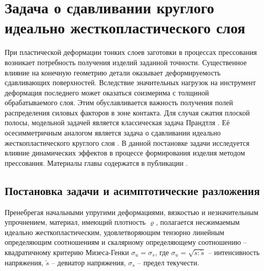 \chapter{Задача о сдавливании круглого идеально жесткопластического слоя}\label{ch:ch1}
При пластической деформации тонких слоев заготовки в процессах прессования возникает потребность получения изделий заданной точности. Существенное влияние на конечную геометрию детали оказывает деформируемость сдавливающих поверхностей. Вследствие значительных нагрузок на инструмент деформация последнего может оказаться соизмерима с толщиной обрабатываемого слоя. Этим обуславливается важность получения полей распределения силовых факторов в зоне контакта. Для случая сжатия плоской полосы, модельной задачей является классическая задача Прандтля \autocite{Prandtl:1948}. Её осесимметричным аналогом является задача о сдавливании идеально жесткопластического круглого слоя \autocite{Georgievsky:2008}. В данной постановке задачи исследуется влияние динамических эффектов в процессе формирования изделия методом прессования. Материалы главы содержатся в публикации \autocite{Shabaykin:2017}.

\section{Постановка задачи и асимптотические разложения}\label{sec:ch1/sec1}

Пренебрегая начальными упругими деформациями, вязкостью и незначительным упрочнением, материал, имеющий плотность $\varrho$, полагается несжимаемым идеально жесткопластическим, удовлетворяющим тензорно линейным определяющим соотношениям и скалярному определяющему соотношению -- квадратичному критерию Мизеса-Генки $\sigma_{u} = \sigma_{s}$, где $\sigma_{u} = \sqrt{\utilde{s} : \utilde{s}}$ -- интенсивность напряжения, $\utilde{s}$ -- девиатор напряжения, $\sigma_{s}$ -- предел текучести.

